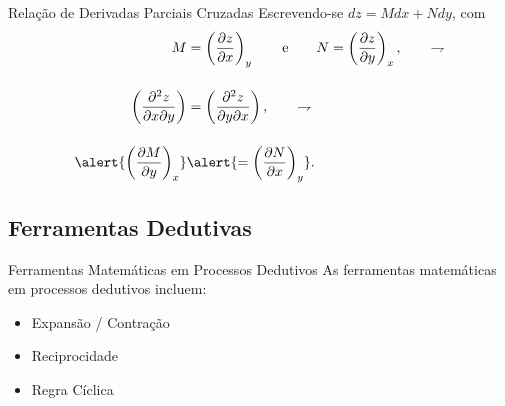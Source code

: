     \begin{frame}{Relação de Derivadas Parciais Cruzadas}\vspace*{-2em}
        Escrevendo-se \alert{$dz = Mdx + Ndy$}, com
        \begin{align*}
            M &=
                \left(
                    \frac{\partial z}{\partial x}
                \right)_y
            \qquad\mbox{e}\qquad
            N =
                \left(
                    \frac{\partial z}{\partial y}
                \right)_x,
            \qquad\rightharpoondown
            \\[\bigskipamount]
            \left(
                \frac{\partial^2 z}{\partial x\partial y}
            \right) &=
            \left(
                \frac{\partial^2 z}{\partial y\partial x}
            \right),
            \qquad\rightharpoondown
            \\[\bigskipamount]
            \alert{\left(
                \frac{\partial M}{\partial y}
            \right)_x} &\alert{=
            \left(
                \frac{\partial N}{\partial x}
            \right)_y}.
        \end{align*}
    \end{frame}

\subsection{Ferramentas Dedutivas}

    \begin{frame}{Ferramentas Matemáticas em Processos Dedutivos}\vspace*{-2em}
        As ferramentas matemáticas em processos dedutivos incluem: \vspace*\bigskipamount

        \begin{itemize}
            \item \alert{Expansão / Contração} \vspace*\medskipamount
            \item \alert{Reciprocidade} \vspace*\medskipamount
            \item \alert{Regra Cíclica}
        \end{itemize}
    \end{frame}

